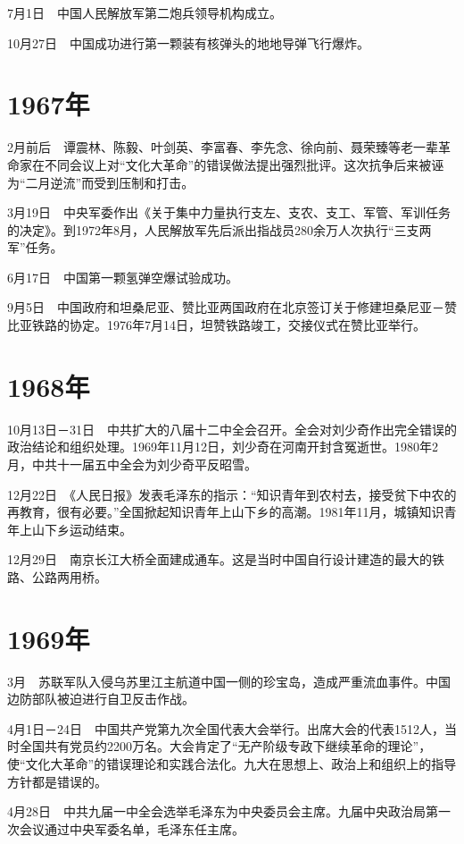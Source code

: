 \documentclass[10pt,a4paper,twocolumn]{book}
\begin{document}
7月1日　中国人民解放军第二炮兵领导机构成立。

10月27日　中国成功进行第一颗装有核弹头的地地导弹飞行爆炸。

\section{1967年}

2月前后　谭震林、陈毅、叶剑英、李富春、李先念、徐向前、聂荣臻等老一辈革命家在不同会议上对“文化大革命”的错误做法提出强烈批评。这次抗争后来被诬为“二月逆流”而受到压制和打击。

3月19日　中央军委作出《关于集中力量执行支左、支农、支工、军管、军训任务的决定》。到1972年8月，人民解放军先后派出指战员280余万人次执行“三支两军”任务。

6月17日　中国第一颗氢弹空爆试验成功。

9月5日　中国政府和坦桑尼亚、赞比亚两国政府在北京签订关于修建坦桑尼亚－赞比亚铁路的协定。1976年7月14日，坦赞铁路竣工，交接仪式在赞比亚举行。

\section{1968年}

10月13日－31日　中共扩大的八届十二中全会召开。全会对刘少奇作出完全错误的政治结论和组织处理。1969年11月12日，刘少奇在河南开封含冤逝世。1980年2月，中共十一届五中全会为刘少奇平反昭雪。

12月22日　《人民日报》发表毛泽东的指示：“知识青年到农村去，接受贫下中农的再教育，很有必要。”全国掀起知识青年上山下乡的高潮。1981年11月，城镇知识青年上山下乡运动结束。

12月29日　南京长江大桥全面建成通车。这是当时中国自行设计建造的最大的铁路、公路两用桥。

\section{1969年}

3月　苏联军队入侵乌苏里江主航道中国一侧的珍宝岛，造成严重流血事件。中国边防部队被迫进行自卫反击作战。

4月1日－24日　中国共产党第九次全国代表大会举行。出席大会的代表1512人，当时全国共有党员约2200万名。大会肯定了“无产阶级专政下继续革命的理论”，使“文化大革命”的错误理论和实践合法化。九大在思想上、政治上和组织上的指导方针都是错误的。

4月28日　中共九届一中全会选举毛泽东为中央委员会主席。九届中央政治局第一次会议通过中央军委名单，毛泽东任主席。
\end{document}
